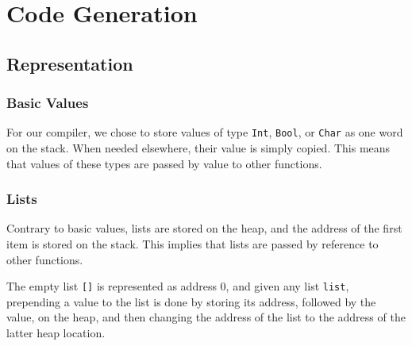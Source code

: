 \chapter{Code Generation}

\section{Representation}

\subsection{Basic Values}
For our compiler, we chose to store values of type \lstinline|Int|, \lstinline|Bool|, or \lstinline|Char| as one word on the stack. When needed elsewhere, their value is simply copied. This means that values of these types are passed by value to other functions.

\subsection{Lists}
Contrary to basic values, lists are stored on the heap, and the address of the first item is stored on the stack. This implies that lists are passed by reference to other functions.

The empty list \lstinline|[]| is represented as address 0, and given any list \lstinline|list|, prepending a value to the list is done by storing its address, followed by the value, on the heap, and then changing the address of the list to the address of the latter heap location.

